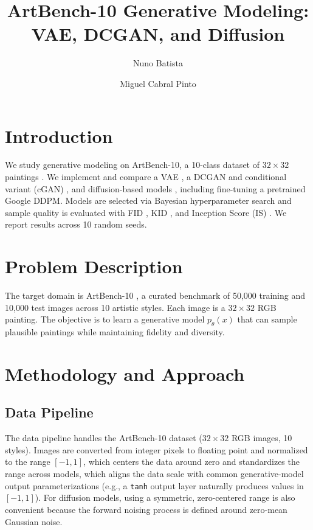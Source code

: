 \documentclass[runningheads]{llncs}
\begin{document}
\title{ArtBench-10 Generative Modeling: VAE, DCGAN, and Diffusion}
\author{Nuno Batista \and Miguel Cabral Pinto}
\maketitle

\section{Introduction}
We study generative modeling on ArtBench-10, a 10-class dataset of $32\times 32$ paintings \cite{artbench}. We implement and compare a VAE \cite{vae}, a DCGAN and conditional variant (cGAN) \cite{dcgan}, and diffusion-based models \cite{ddpm}, including fine-tuning a pretrained Google DDPM. Models are selected via Bayesian hyperparameter search and sample quality is evaluated with FID \cite{fid}, KID \cite{kid}, and Inception Score (IS) \cite{is}. We report results across 10 random seeds.

\section{Problem Description}
The target domain is ArtBench-10 \cite{artbench}, a curated benchmark of 50,000 training and 10,000 test images across 10 artistic styles. Each image is a $32 \times 32$ RGB painting. The objective is to learn a generative model $p_\theta(x)$ that can sample plausible paintings while maintaining fidelity and diversity. 

\section{Methodology and Approach}

\subsection{Data Pipeline}
The data pipeline handles the ArtBench-10 dataset ($32 \times 32$ RGB images, 10 styles). Images are converted from integer pixels to floating point and normalized to the range $[-1, 1]$, which centers the data around zero and standardizes the range across models, which aligns the data scale with common generative-model output parameterizations (e.g., a \texttt{tanh} output layer naturally produces values in $[-1,1]$). For diffusion models, using a symmetric, zero-centered range is also convenient because the forward noising process is defined around zero-mean Gaussian noise.
\end{document}
